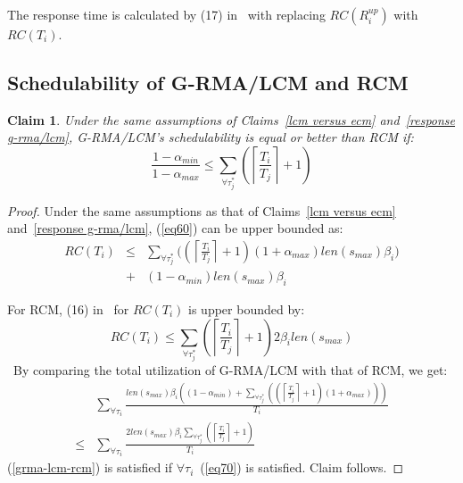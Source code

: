 \documentclass[a4paper,english]{article}
\newtheorem{clm}{Claim}
\newtheorem{proof}{Proof}
\begin{document}
The response time is calculated by (17) in~\cite{stmconcurrencycontrol:emsoft11} with replacing $RC(R_i^{up})$ with $RC(T_i)$.

\subsection{Schedulability of G-RMA/LCM and RCM}
\label{rma eval}

\begin{clm}\label{rma_eval_clm}
Under the same assumptions of Claims~\ref{lcm versus ecm} and~\ref{response g-rma/lcm}, G-RMA/LCM's schedulability is equal or better than RCM if:
\begin{equation}
\frac{1-\alpha_{min}}{1-\alpha_{max}}\le \sum_{\forall \tau_j^*}\left( \left\lceil\frac{T_i}{T_j}\right\rceil +1 \right)
\label{eq70}\end{equation}
\end{clm}

\begin{proof}\normalfont
Under the same assumptions as that of Claims~\ref{lcm versus ecm} and~\ref{response g-rma/lcm}, (\ref{eq60}) can be upper bounded as:
\begin{eqnarray}
RC(T_i) & \le & \sum_{\forall \tau_{j}^{*}}\bigg(\left(\left\lceil\frac{T_{i}}{T_{j}}\right\rceil +1\right)(1+\alpha_{max})
 len(s_{max})\beta_{i}\bigg)\nonumber\\
 & + & (1-\alpha_{min})len(s_{max})\beta_{i}\label{eq68}\end{eqnarray}
 
For RCM, (16) in~\cite{stmconcurrencycontrol:emsoft11} for $RC(T_{i})$ is upper bounded by:
\begin{equation*}
RC(T_{i})\le\sum_{\forall \tau_{j}^{*}}\left(\left\lceil\frac{T_{i}}{T_{j}}\right\rceil +1\right)2\beta_{i}len(s_{max})\label{eq69}\end{equation*}\
By comparing the total utilization of G-RMA/LCM with that of RCM,
we get:
\begin{eqnarray}
 & \sum_{\forall\tau_{i}}\frac{len\left(s_{max}\right)\beta_{i}\left(\left(1-\alpha_{min}\right)+\sum_{\forall\tau_{j}^{*}}\left(\left(\left\lceil\frac{T_{i}}{T_{j}}\right\rceil+1\right)\left(1+\alpha_{max}\right)\right)\right)}{T_{i}}\nonumber\\
\le & \sum_{\forall\tau_{i}}\frac{2len\left(s_{max}\right)\beta_{i}\sum_{\forall\tau_{j}^{*}}\left(\left\lceil\frac{T_{i}}{T_{j}}\right\rceil+1\right)}{T_{i}}\label{grma-lcm-rcm}\end{eqnarray}
(\ref{grma-lcm-rcm}) is satisfied if $\forall \tau_i$~(\ref{eq70}) is satisfied. Claim follows.
\end{proof}
\end{document}
